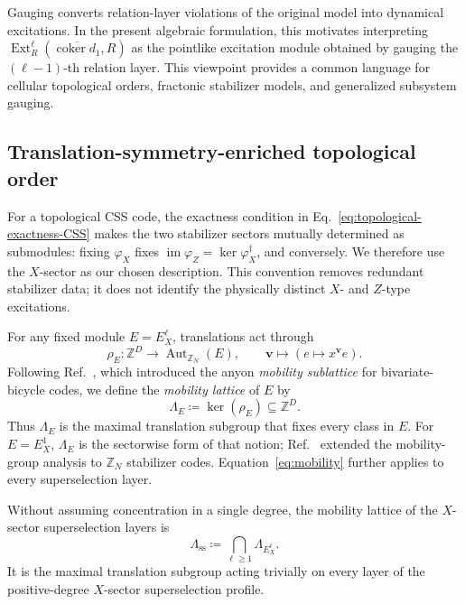 \documentclass[aps,prx,english,superscriptaddress,twocolumn,tightenlines,showpacs,longbibliography,floatfix,amsfonts]{revtex4-2}
\theoremstyle{remark}
\theoremstyle{definition}
\begin{document}
Gauging converts relation-layer violations of the original model into
dynamical excitations. In the present algebraic formulation, this motivates
interpreting
$\operatorname{Ext}_R^\ell
(\overline{\operatorname{coker}d_1},R)$ as the pointlike excitation module
obtained by gauging the $(\ell-1)$-th relation layer. This viewpoint provides
a common language for cellular topological orders, fractonic stabilizer
models, and generalized subsystem gauging.

\subsection{Translation-symmetry-enriched topological order}
\label{subsec:set-order}

For a topological CSS code, the exactness condition
in Eq.~\eqref{eq:topological-exactness-CSS} makes the two stabilizer sectors
mutually determined as submodules: fixing \(\varphi_X\) fixes
\(\operatorname{im}\varphi_Z=\ker\varphi_X^\dagger\), and conversely. We
therefore use the \(X\)-sector as our chosen description. This convention
removes redundant stabilizer data; it does not identify the physically
distinct \(X\)- and \(Z\)-type excitations.

For any fixed module \(E=E_X^\ell\), translations act through
\begin{equation}
	\rho_E\colon
	\mathbb Z^D
	\longrightarrow
	\operatorname{Aut}_{\mathbb Z_N}(E),
	\qquad
	\mathbf v\longmapsto(e\mapsto x^{\mathbf v}e).
\end{equation}
Following Ref.~\cite{Chen2025PRL}, which introduced the anyon
\emph{mobility sublattice} for bivariate-bicycle codes, we define the
\emph{mobility lattice} of \(E\) by
\begin{equation}
	\Lambda_E\coloneqq\ker(\rho_E)\subseteq\mathbb Z^D.
	\label{eq:mobility}
\end{equation}
Thus \(\Lambda_E\) is the maximal translation subgroup that fixes every
class in \(E\).
For \(E=E_X^1\), \(\Lambda_E\) is the sectorwise form of that notion;
Ref.~\cite{He2026PRB} extended the mobility-group analysis to
\(\mathbb Z_N\) stabilizer codes. Equation~\eqref{eq:mobility} further
applies to every superselection layer.

Without assuming concentration in a single degree, the mobility lattice of
the \(X\)-sector superselection layers is
\begin{equation}
	\Lambda_{\mathrm{ss}}
	\coloneqq
	\bigcap_{\ell\geq 1}\Lambda_{E_X^\ell}.
\end{equation}
It is the maximal translation subgroup acting trivially on every layer of the
positive-degree \(X\)-sector superselection profile.
\end{document}
